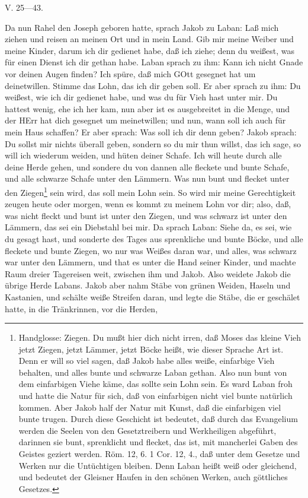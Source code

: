 \begin{schriftzitat}
V. 25—43.

Da nun Rahel den Joseph geboren hatte, sprach Jakob zu Laban: Laß mich ziehen und reisen an meinen Ort und in mein Land. Gib mir meine Weiber und meine Kinder, darum ich dir gedienet habe, daß ich ziehe; denn du weißest, was für einen Dienst ich dir gethan habe. Laban sprach zu ihm: Kann ich nicht Gnade vor deinen Augen finden? Ich spüre, daß mich GOtt gesegnet hat um deinetwillen. Stimme das Lohn, das ich dir geben soll. Er aber sprach zu ihm: Du weißest, wie ich dir gedienet habe, und was du für Vieh hast unter mir. Du hattest wenig, ehe ich her kam, nun aber ist es ausgebreitet in die Menge, und der HErr hat dich gesegnet um meinetwillen; und nun, wann soll ich auch für mein Haus schaffen? Er aber sprach: Was soll ich dir denn geben? Jakob sprach: Du sollst mir nichts überall geben, sondern so du mir thun willst, das ich sage, so will ich wiederum weiden, und hüten deiner Schafe. Ich will heute durch alle deine Herde gehen, und sondere du von dannen alle fleckete und bunte Schafe, und alle schwarze Schafe unter den Lämmern. Was nun bunt und flecket unter den Ziegen\footnote{Handglosse: Ziegen. Du mußt hier dich nicht irren, daß Moses das kleine Vieh jetzt Ziegen, jetzt Lämmer, jetzt Böcke heißt, wie dieser Sprache Art ist. Denn er will so viel sagen, daß Jakob habe alles weiße, einfarbige Vieh behalten, und alles bunte und schwarze Laban gethan. Also nun bunt von dem einfarbigen Viehe käme, das sollte sein Lohn sein. Es ward Laban froh und hatte die Natur für sich, daß von einfarbigen nicht viel bunte natürlich kommen. Aber Jakob half der Natur mit Kunst, daß die einfarbigen viel bunte trugen. Durch diese Geschicht ist bedeutet, daß durch das Evangelium werden die Seelen von den Gesetztreibern und Werkheiligen abgeführt, darinnen sie bunt, sprenklicht und flecket, das ist, mit mancherlei Gaben des Geistes geziert werden. Röm. 12, 6. 1 Cor. 12, 4., daß unter dem Gesetze und Werken nur die Untüchtigen bleiben. Denn Laban heißt weiß oder gleichend, und bedeutet der Gleisner Haufen in den schönen Werken, auch göttliches Gesetzes.} sein wird, das soll mein Lohn sein. So wird mir meine Gerechtigkeit zeugen heute oder morgen, wenn es kommt zu meinem Lohn vor dir; also, daß, was nicht fleckt und bunt ist unter den Ziegen, und was schwarz ist unter den Lämmern, das sei ein Diebstahl bei mir. Da sprach Laban: Siehe da, es sei, wie du gesagt hast, und sonderte des Tages aus sprenkliche und bunte Böcke, und alle fleckete und bunte Ziegen, wo nur was Weißes daran war, und alles, was schwarz war unter den Lämmern, und that es unter die Hand seiner Kinder, und machte Raum dreier Tagereisen weit, zwischen ihm und Jakob. Also weidete Jakob die übrige Herde Labans. Jakob aber nahm Stäbe von grünen Weiden, Haseln und Kastanien, und schälte weiße Streifen daran, und legte die Stäbe, die er geschälet hatte, in die Tränkrinnen, vor die Herden,

\end{schriftzitat}
